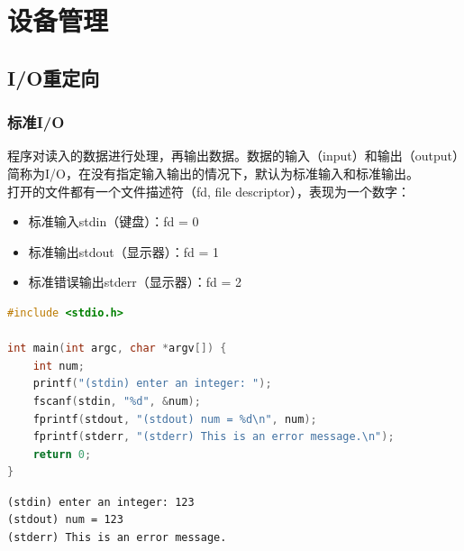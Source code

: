 \chapter{设备管理}

\section{I/O重定向}

\subsection{标准I/O}

程序对读入的数据进行处理，再输出数据。数据的输入（input）和输出（output）简称为I/O，在没有指定输入输出的情况下，默认为标准输入和标准输出。\\

打开的文件都有一个文件描述符（fd, file descriptor），表现为一个数字：

\begin{itemize}
	\item 标准输入stdin（键盘）：fd = 0
	\item 标准输出stdout（显示器）：fd = 1
	\item 标准错误输出stderr（显示器）：fd = 2
\end{itemize}

\vspace{0.5cm}


\begin{lstlisting}[language=C]
#include <stdio.h>

int main(int argc, char *argv[]) {
    int num;
    printf("(stdin) enter an integer: ");
    fscanf(stdin, "%d", &num);
    fprintf(stdout, "(stdout) num = %d\n", num);
    fprintf(stderr, "(stderr) This is an error message.\n");
    return 0;
}
\end{lstlisting}

\begin{tcolorbox}
	\begin{verbatim}
(stdin) enter an integer: 123
(stdout) num = 123
(stderr) This is an error message.
	\end{verbatim}
\end{tcolorbox}

\vspace{0.5cm}


